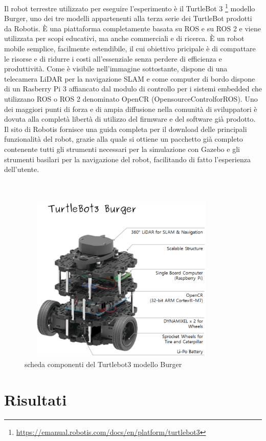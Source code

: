 \documentclass[a4paper,11 pt,oneside]{book}
\theoremstyle{definition}
\begin{document}
Il robot terrestre utilizzato per eseguire l'esperimento è il TurtleBot 3 \footnote{\url{https://emanual.robotis.com/docs/en/platform/turtlebot3}} modello Burger, uno dei tre modelli appartenenti alla terza serie dei TurtleBot prodotti da Robotis.
È una piattaforma completamente basata su ROS e su ROS 2 e viene utilizzata per scopi educativi, ma anche commerciali e di ricerca. È un robot mobile semplice, facilmente estendibile, il cui obiettivo pricipale è di compattare le risorse e di ridurre i costi all'essenziale senza perdere di efficienza e produttività. Come è visibile nell'immagine sottostante, dispone di una telecamera LiDAR per la navigazione SLAM e come computer di bordo dispone di un Rasberry Pi 3 affiancato dal modulo di controllo per i sistemi embedded che utilizzano ROS o ROS 2 denominato OpenCR (OpensourceControlforROS).
Uno dei maggiori punti di forza e di ampia diffusione nella comunità di sviluppatori è dovuta alla completà libertà di utilizzo del firmware e del software già prodotto. Il sito di Robotis fornisce una guida completa per il download delle principali funzionalità del robot, grazie alla quale si ottiene un pacchetto già completo contenente tutti gli strumenti necessari per la simulazione con Gazebo e gli strumenti basilari per la navigazione del robot, facilitando di fatto l'esperienza dell'utente.
\\
\\
\\
\begin{figure}[htbp]
\includegraphics[width=10cm, height=8cm]{tb3-components.png}
\caption{scheda componenti del Turtlebot3 modello Burger}
\label{burger}
\end{figure}


\section{Risultati}
\end{document}
